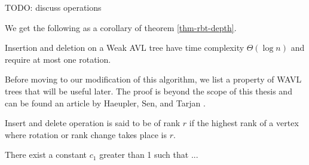 





TODO: discuss operations

We get the following as a corollary of theorem \ref{thm-rbt-depth}.

\begin{prop}
Insertion and deletion on a Weak AVL tree have time complexity $\Theta(\log n)$ and require at most one rotation.
\end{prop}

Before moving to our modification of this algorithm, we list a property of WAVL trees that will be useful later. The proof is beyond the scope of this thesis and can be found an article by Haeupler, Sen, and Tarjan \cite{rank-balanced-trees}.

\begin{defn}
Insert and delete operation is said to be of rank $r$ if the highest rank of a vertex where rotation or rank change takes place is $r$.
\end{defn}

\begin{prop}
There exist a constant $c_1$ greater than 1 such that ...
\end{prop}